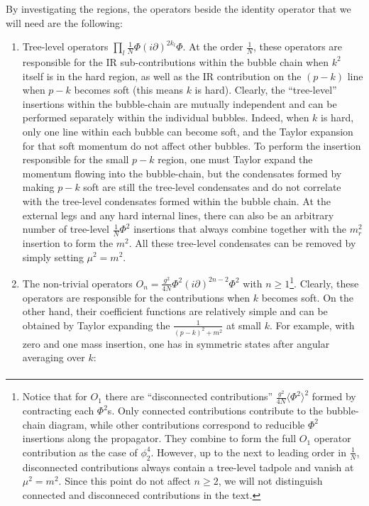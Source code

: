 \documentclass[a4paper,11pt]{article}
\begin{document}
By investigating the regions, the operators beside the identity operator that we will need are the following:
\begin{enumerate}
    \item Tree-level operators $\prod_{l}\frac{1}{N}\Phi(i\partial)^{2k_l}\Phi$. At the order $\frac{1}{N}$, these operators are responsible for the IR sub-contributions within the bubble chain when $k^2$ itself is in the hard region, as well as the IR contribution on the $(p-k)$ line when $p-k$ becomes soft (this means $k$ is hard). Clearly, the ``tree-level'' insertions within the bubble-chain are mutually independent and can be performed separately within the individual bubbles. Indeed, when $k$ is hard, only one line within each bubble can become soft, and the Taylor expansion for that soft momentum do not affect other bubbles. To perform the insertion responsible for the small $p-k$ region, one must Taylor expand the momentum flowing into the bubble-chain, but the condensates formed by making  $p-k$ soft are still the tree-level condensates and do not correlate with the tree-level condensates formed within the bubble chain. At the external legs and any hard internal lines, there can also be an arbitrary number of tree-level $\frac{1}{N}\Phi^2$ insertions that always combine together with the $m_r^2$ insertion to form the $m^2$.  All these tree-level condensates can be removed by simply setting $\mu^2=m^2$. 
    \item The non-trivial operators $O_n=\frac{g^2}{4N}\Phi^2 (i\partial)^{2n-2}\Phi^2$ with $n\ge 1$\footnote{Notice that for $O_1$ there are ``disconnected contributions'' $\frac{g^2}{4N}\langle \Phi^2 \rangle^2$ formed by contracting each $\Phi^2$s. Only connected contributions contribute to the bubble-chain diagram, while other contributions correspond to reducible $\Phi^2$ insertions along the propagator. They combine to form the full $O_1$ operator contribution as the case of $\phi_2^4$. However, up to the next to leading order in $\frac{1}{N}$, disconnected contributions always contain a tree-level tadpole and vanish at $\mu^2=m^2$. Since this point do not affect $n\ge 2$, we will not distinguish connected and disconneced contributions in the text.}.  Clearly, these operators are responsible for the contributions when $k$ becomes soft. On the other hand, their coefficient functions are relatively simple and can be obtained by Taylor expanding the $\frac{1}{(p-k)^2+m^2}$ at small $k$. For example, with zero and one mass insertion, one has in symmetric states after angular averaging over $k$: 
    \begin{align} 

\end{align}
\end{enumerate}
\end{document}
